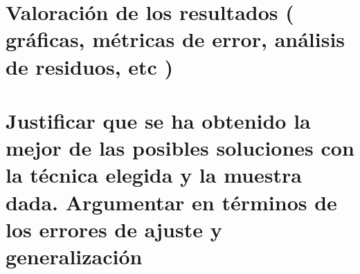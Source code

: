 \documentclass{article}
\begin{document}
	
	
	\section{Valoración de los resultados ( gráficas, métricas de error, análisis de residuos, etc )} %
	
	
	
	\section{Justificar que se ha obtenido la mejor de las posibles soluciones con la técnica elegida y la muestra dada. Argumentar en términos de los errores de ajuste y generalización} %
	
	
	
\end{document}
